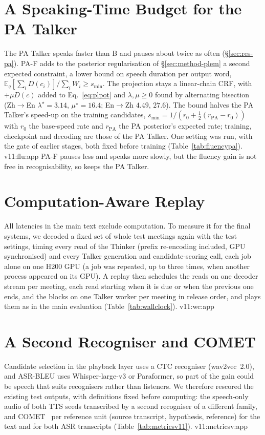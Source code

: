 \ifFluencyPA
\section{A Speaking-Time Budget for the PA Talker}
\label{app:fluencypa}
The PA Talker speaks faster than B and pauses about twice as often (\S\ref{sec:res-pa}). PA-F adds to the posterior
regularisation of \S\ref{sec:method-plem} a second expected constraint, a lower bound on speech duration per output word,
$\mathbb{E}_q[\sum_i D(c_i)]/\sum_iW_i\ge s_{\min}$. The projection stays a linear-chain CRF, with $+\mu D(c)$ added to
Eq.~\eqref{eq:plpot} and $\lambda,\mu\ge0$ found by alternating bisection (Zh$\rightarrow$En $\lambda^\star=3.14$,
$\mu^\star=16.4$; En$\rightarrow$Zh $4.49$, $27.6$). The bound halves the PA Talker's speed-up on the training
candidates, $s_{\min}=1/(r_0+\tfrac12(r_\text{PA}-r_0))$ with $r_0$ the base-speed rate and $r_\text{PA}$ the PA
posterior's expected rate; training, checkpoint and decoding are those of the PA Talker. One setting was run, with the
gate of earlier stages, both fixed before training (Table~\ref{tab:fluencypa}). \num{v11:flu:app} PA-F pauses less and
speaks more slowly, but the fluency gain is not free in recognisability, so \sys{} keeps the PA Talker.

\fi

\ifWallclock
\section{Computation-Aware Replay}
\label{app:wallclock}
All latencies in the main text exclude computation. To measure it for the final systems, we decoded a fixed set of
whole test meetings again with the test settings, timing every read of the Thinker (prefix re-encoding included, GPU
synchronised) and every Talker generation and candidate-scoring call, each job alone on one H200 GPU (a job was
repeated, up to three times, when another process appeared on its GPU). A replay then schedules the reads on one
decoder stream per meeting, each read starting when it is due or when the previous one ends, and the blocks on one
Talker worker per meeting in release order, and plays them as in the main evaluation (Table~\ref{tab:wallclock}).
\num{v11:wc:app}

\fi

\ifMetricsV
\section{A Second Recogniser and COMET}
\label{app:metricsv11}
Candidate selection in the playback layer uses a CTC recogniser (wav2vec~2.0), and ASR-BLEU uses Whisper-large-v3 or
Paraformer, so part of the gain could be speech that suits recognisers rather than listeners. We therefore rescored the
existing test outputs, with definitions fixed before computing: the speech-only audio of both TTS seeds transcribed by a
second recogniser of a different family, and COMET~\citep{rei2022comet} per reference unit (source transcript,
hypothesis, reference) for the text and for both ASR transcripts (Table~\ref{tab:metricsv11}). \num{v11:metricsv:app}

\fi
